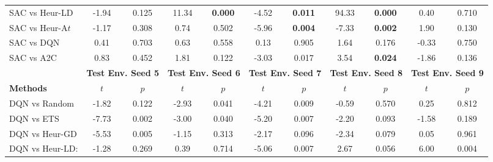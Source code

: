 \begin{tabular}{lcccccccccc}
	SAC vs Heur-LD   & -1.94         & 0.125                  & 11.34         & \textbf{0.000}         & -4.52          & \textbf{0.011}        & 94.33          & \textbf{0.000}        & 0.40           & 0.710                 \\
	SAC vs Heur-A$t$  & -1.17         & 0.308                  & 0.74          & 0.502                  & -5.96          & \textbf{0.004}        & -7.33          & \textbf{0.002}        & 1.90           & 0.130                 \\
	SAC vs DQN       & 0.41          & 0.703                  & 0.63          & 0.558                  & 0.13           & 0.905                 & 1.64           & 0.176                 & -0.33          & 0.750                 \\
	SAC vs A2C       & 0.83          & 0.452                  & 1.81          & 0.122                  & -3.03          & 0.017                 & 3.54           & \textbf{0.024}        & -1.86          & 0.136                 \\
	\midrule 
	& \multicolumn{2}{c}{\textbf{Test Env. Seed 5}} & \multicolumn{2}{c}{\textbf{Test Env. Seed 6}} & \multicolumn{2}{c}{\textbf{Test Env. Seed 7}} & \multicolumn{2}{c}{\textbf{Test Env. Seed 8}} & \multicolumn{2}{c}{\textbf{Test Env. Seed 9}} \\
	\cmidrule(lr){2-3} \cmidrule(lr){4-5} \cmidrule(lr){6-7} \cmidrule(lr){8-9} \cmidrule(lr){10-11}
	\textbf{Methods} & $t$              & $p$                         & $t$              & $p$                         & $t$               & $p$                        & $t$               & $p$                        & $t$               & $p$                        \\
	\midrule 
	DQN vs Random    & -1.82         & 0.122                  & -2.93         & 0.041                  & -4.21          & 0.009                 & -0.59          & 0.570                 & 0.25           & 0.812                 \\
	DQN vs ETS       & -7.73         & 0.002                  & -3.00         & 0.040                  & -5.20          & 0.007                 & -2.20          & 0.093                 & -1.58          & 0.189                 \\
	DQN vs Heur-GD   & -5.53         & 0.005                  & -1.15         & 0.313                  & -2.17          & 0.096                 & -2.34          & 0.079                 & 0.05           & 0.961                 \\
	DQN vs Heur-LD:  & -1.28         & 0.269                  & 0.39          & 0.714                  & -5.06          & 0.007                 & 2.67           & 0.056                 & 6.00           & 0.004                 \\

\end{tabular}
